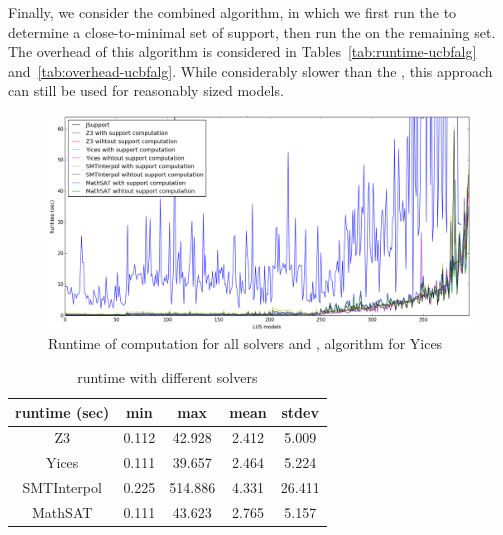 
Finally, we consider the combined \ucbfalg algorithm, in which we first run the \ucalg to determine a close-to-minimal set of support, then run the \bfalg on the remaining set.  The overhead of this algorithm is considered in Tables~\ref{tab:runtime-ucbfalg} and~\ref{tab:overhead-ucbfalg}.  While considerably slower than the \ucalg, this approach can still be used for reasonably sized models.

\begin{figure}
  \centering
  \includegraphics[width=\textwidth]{figs/runtimeAll.png}
  \caption{Runtime of \ucalg computation for all solvers and \bfalg, \ucbfalg algorithm for Yices}\label{fig:runtimeall}
\end{figure}


\begin{table}
  \centering
  \begin{tabular}{ |c||c|c|c|c| }
    \hline
     runtime (sec) & min & max & mean & stdev \\[0.5ex]
    \hline\hline
    Z3   & 0.112 & 42.928 & 2.412 & 5.009 \\[0.5ex]
    Yices &   0.111  & 39.657   & 2.464 & 5.224 \\[0.5ex]
    SMTInterpol& 0.225 & 514.886 &  4.331 & 26.411 \\[0.5ex]
    MathSAT & 0.111 & 43.623 &  2.765 & 5.157 \\[0.5ex]
    \hline
  \end{tabular} \\
  \caption{\ucalg runtime with different solvers}
  \label{tab:runtime-ucalg}
\end{table}

